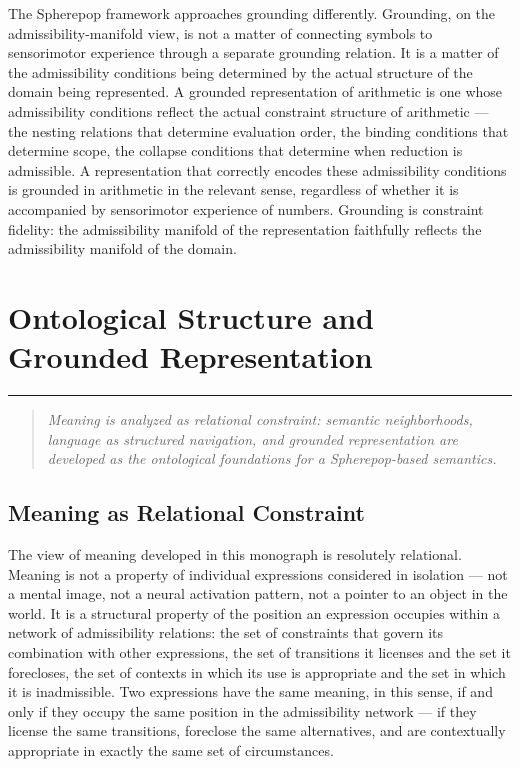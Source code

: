 \documentclass[12pt,openany]{book}
\theoremstyle{plain}
\theoremstyle{definition}
\theoremstyle{remark}
\newcommand{\chapterrule}{%
  \vspace{4pt}%
  {\color{SpherepopBlue}\rule{\textwidth}{0.8pt}}%
  \vspace{10pt}%
}
\newenvironment{chapterprecis}{%
  \begin{quote}\small\itshape}{%
  \end{quote}\medskip}
\begin{document}
The Spherepop framework approaches grounding differently. Grounding, on the admissibility-manifold view, is not a matter of connecting symbols to sensorimotor experience through a separate grounding relation. It is a matter of the admissibility conditions being determined by the actual structure of the domain being represented. A grounded representation of arithmetic is one whose admissibility conditions reflect the actual constraint structure of arithmetic — the nesting relations that determine evaluation order, the binding conditions that determine scope, the collapse conditions that determine when reduction is admissible. A representation that correctly encodes these admissibility conditions is grounded in arithmetic in the relevant sense, regardless of whether it is accompanied by sensorimotor experience of numbers. Grounding is constraint fidelity: the admissibility manifold of the representation faithfully reflects the admissibility manifold of the domain.

\chapter{Ontological Structure and Grounded Representation}
\chapterrule

\begin{chapterprecis}
Meaning is analyzed as relational constraint: semantic
neighborhoods, language as structured navigation, and grounded
representation are developed as the ontological foundations for
a Spherepop-based semantics.
\end{chapterprecis}

\section{Meaning as Relational Constraint}

The view of meaning developed in this monograph is resolutely relational. Meaning is not a property of individual expressions considered in isolation — not a mental image, not a neural activation pattern, not a pointer to an object in the world. It is a structural property of the position an expression occupies within a network of admissibility relations: the set of constraints that govern its combination with other expressions, the set of transitions it licenses and the set it forecloses, the set of contexts in which its use is appropriate and the set in which it is inadmissible. Two expressions have the same meaning, in this sense, if and only if they occupy the same position in the admissibility network — if they license the same transitions, foreclose the same alternatives, and are contextually appropriate in exactly the same set of circumstances.
\end{document}
